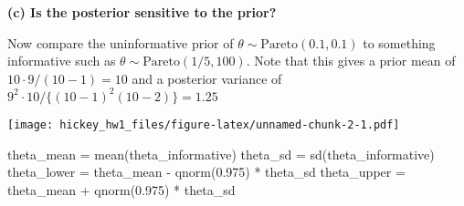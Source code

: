 \documentclass[
]{article}
\newenvironment{Shaded}{\begin{snugshade}}{\end{snugshade}}
\newcommand{\AttributeTok}[1]{\textcolor[rgb]{0.77,0.63,0.00}{#1}}
\newcommand{\CommentTok}[1]{\textcolor[rgb]{0.56,0.35,0.01}{\textit{#1}}}
\newcommand{\DecValTok}[1]{\textcolor[rgb]{0.00,0.00,0.81}{#1}}
\newcommand{\FloatTok}[1]{\textcolor[rgb]{0.00,0.00,0.81}{#1}}
\newcommand{\FunctionTok}[1]{\textcolor[rgb]{0.00,0.00,0.00}{#1}}
\newcommand{\NormalTok}[1]{#1}
\newcommand{\OtherTok}[1]{\textcolor[rgb]{0.56,0.35,0.01}{#1}}
\newcommand{\SpecialCharTok}[1]{\textcolor[rgb]{0.00,0.00,0.00}{#1}}
\newcommand{\StringTok}[1]{\textcolor[rgb]{0.31,0.60,0.02}{#1}}
\begin{document}
\textbf{(c) Is the posterior sensitive to the prior?}

Now compare the uninformative prior of
\(\theta \sim \text{Pareto}(0.1, 0.1)\) to something informative such as
\(\theta \sim \text{Pareto}(1/5,100)\). Note that this gives a prior
mean of \(10 \cdot 9/(10-1) = 10\) and a posterior variance of
\(9^{2}\cdot 10 / \{ (10-1)^{2}(10-2) \} = 1.25\)

\begin{Shaded}
\end{Shaded}

\texttt{[image: hickey\_hw1\_files/figure-latex/unnamed-chunk-2-1.pdf]}

\begin{Shaded}
\begin{Highlighting}[]
\NormalTok{theta\_mean }\OtherTok{=} \FunctionTok{mean}\NormalTok{(theta\_informative)}
\NormalTok{theta\_sd }\OtherTok{=} \FunctionTok{sd}\NormalTok{(theta\_informative)}
\NormalTok{theta\_lower }\OtherTok{=}\NormalTok{ theta\_mean }\SpecialCharTok{{-}} \FunctionTok{qnorm}\NormalTok{(}\FloatTok{0.975}\NormalTok{) }\SpecialCharTok{*}\NormalTok{ theta\_sd}
\NormalTok{theta\_upper }\OtherTok{=}\NormalTok{ theta\_mean }\SpecialCharTok{+} \FunctionTok{qnorm}\NormalTok{(}\FloatTok{0.975}\NormalTok{) }\SpecialCharTok{*}\NormalTok{ theta\_sd}
\end{Highlighting}
\end{Shaded}
\end{document}

